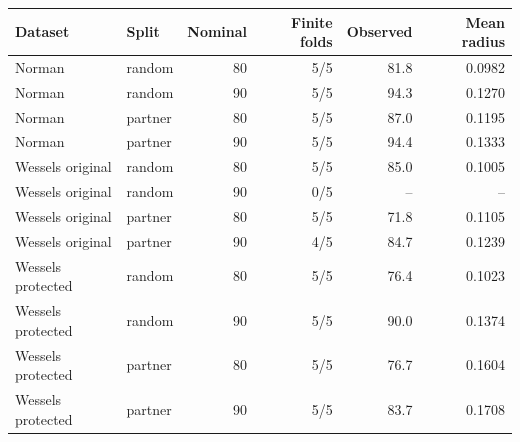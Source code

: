 \begin{tabular}{llrrrr}\toprule
Dataset & Split & Nominal & Finite folds & Observed & Mean radius \\ \midrule
Norman & random & 80 & 5/5 & 81.8 & 0.0982 \\
Norman & random & 90 & 5/5 & 94.3 & 0.1270 \\
Norman & partner & 80 & 5/5 & 87.0 & 0.1195 \\
Norman & partner & 90 & 5/5 & 94.4 & 0.1333 \\
Wessels original & random & 80 & 5/5 & 85.0 & 0.1005 \\
Wessels original & random & 90 & 0/5 & -- & -- \\
Wessels original & partner & 80 & 5/5 & 71.8 & 0.1105 \\
Wessels original & partner & 90 & 4/5 & 84.7 & 0.1239 \\
Wessels protected & random & 80 & 5/5 & 76.4 & 0.1023 \\
Wessels protected & random & 90 & 5/5 & 90.0 & 0.1374 \\
Wessels protected & partner & 80 & 5/5 & 76.7 & 0.1604 \\
Wessels protected & partner & 90 & 5/5 & 83.7 & 0.1708 \\
\bottomrule\end{tabular}
